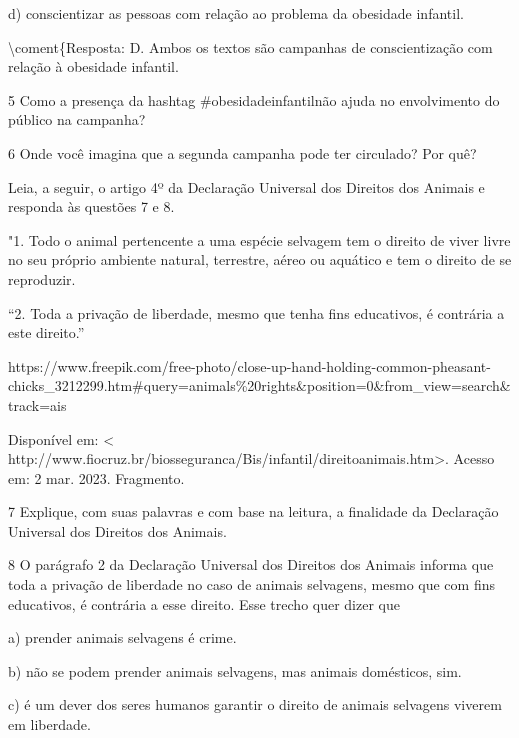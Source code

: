 {d) conscientizar as pessoas com relação ao problema da obesidade
infantil.

\textbackslash coment\{Resposta: D. Ambos os textos são campanhas de
conscientização com relação à obesidade infantil.

\num{5} Como a presença da hashtag \#obesidadeinfantilnão ajuda no
envolvimento do público na campanha?


\num{6} Onde você imagina que a segunda campanha pode ter circulado? Por
quê?


Leia, a seguir, o artigo 4º da Declaração Universal dos Direitos dos
Animais e responda às questões 7 e 8.

"1. Todo o animal pertencente a uma espécie selvagem tem o direito de
viver livre no seu próprio ambiente natural, terrestre, aéreo ou
aquático e tem o direito de se reproduzir.

``2. Toda a privação de liberdade, mesmo que tenha fins educativos, é
contrária a este direito.''

https://www.freepik.com/free-photo/close-up-hand-holding-common-pheasant-chicks\_3212299.htm\#query=animals\%20rights\&position=0\&from\_view=search\&track=ais

Disponível em: \textless{}
http://www.fiocruz.br/biosseguranca/Bis/infantil/direitoanimais.htm\textgreater.
Acesso em: 2 mar. 2023. Fragmento.

\num{7} Explique, com suas palavras e com base na leitura, a finalidade
da Declaração Universal dos Direitos dos Animais.


\num{8} O parágrafo 2 da Declaração Universal dos Direitos dos Animais
informa que toda a privação de liberdade no caso de animais selvagens,
mesmo que com fins educativos, é contrária a esse direito. Esse trecho
quer dizer que

a) prender animais selvagens é crime.

b) não se podem prender animais selvagens, mas animais domésticos, sim.

c) é um dever dos seres humanos garantir o direito de animais selvagens
viverem em liberdade.

}
